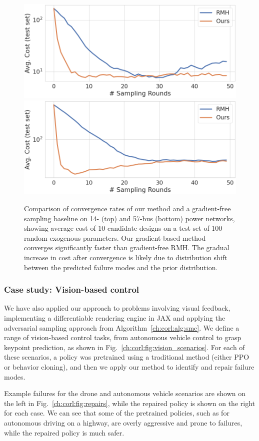 {\begin{figure}[tb]
    \centering
    \includegraphics[width=0.45\linewidth]{images/global_methods/14_bus_training_curves.png}
    \includegraphics[width=0.45\linewidth]{images/global_methods/57_bus_training_curves.png}
    \caption{Comparison of convergence rates of our method and a gradient-free sampling baseline on 14- (top) and 57-bus (bottom) power networks, showing average cost of 10 candidate designs on a test set of 100 random exogenous parameters. Our gradient-based method converges significantly faster than gradient-free RMH. The gradual increase in cost after convergence is likely due to distribution shift between the predicted failure modes and the prior distribution.}
    \label{ch:corl:fig:training_curves}
\end{figure}

\subsubsection{Case study: Vision-based control}

We have also applied our approach to problems involving visual feedback, implementing a differentiable rendering engine in JAX and applying the adversarial sampling approach from Algorithm~\ref{ch:corl:alg:smc}. We define a range of vision-based control tasks, from autonomous vehicle control to grasp keypoint prediction, as shown in Fig.~\ref{ch:corl:fig:vision_scenarios}. For each of these scenarios, a policy was pretrained using a traditional method (either PPO or behavior cloning), and then we apply our method to identify and repair failure modes.

Example failures for the drone and autonomous vehicle scenarios are shown on the left in Fig.~\ref{ch:corl:fig:repairs}, while the repaired policy is shown on the right for each case. We can see that some of the pretrained policies, such as for autonomous driving on a highway, are overly aggressive and prone to failures, while the repaired policy is much safer.

}
